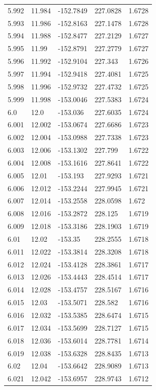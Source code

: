 \begin{tabular}{lllll}
5.992 & 11.984 & -152.7849 & 227.0828 & 1.6728 \\
5.993 & 11.986 & -152.8163 & 227.1478 & 1.6728 \\
5.994 & 11.988 & -152.8477 & 227.2129 & 1.6727 \\
5.995 & 11.99 & -152.8791 & 227.2779 & 1.6727 \\
5.996 & 11.992 & -152.9104 & 227.343 & 1.6726 \\
5.997 & 11.994 & -152.9418 & 227.4081 & 1.6725 \\
5.998 & 11.996 & -152.9732 & 227.4732 & 1.6725 \\
5.999 & 11.998 & -153.0046 & 227.5383 & 1.6724 \\
6.0 & 12.0 & -153.036 & 227.6035 & 1.6724 \\
6.001 & 12.002 & -153.0674 & 227.6686 & 1.6723 \\
6.002 & 12.004 & -153.0988 & 227.7338 & 1.6723 \\
6.003 & 12.006 & -153.1302 & 227.799 & 1.6722 \\
6.004 & 12.008 & -153.1616 & 227.8641 & 1.6722 \\
6.005 & 12.01 & -153.193 & 227.9293 & 1.6721 \\
6.006 & 12.012 & -153.2244 & 227.9945 & 1.6721 \\
6.007 & 12.014 & -153.2558 & 228.0598 & 1.672 \\
6.008 & 12.016 & -153.2872 & 228.125 & 1.6719 \\
6.009 & 12.018 & -153.3186 & 228.1903 & 1.6719 \\
6.01 & 12.02 & -153.35 & 228.2555 & 1.6718 \\
6.011 & 12.022 & -153.3814 & 228.3208 & 1.6718 \\
6.012 & 12.024 & -153.4128 & 228.3861 & 1.6717 \\
6.013 & 12.026 & -153.4443 & 228.4514 & 1.6717 \\
6.014 & 12.028 & -153.4757 & 228.5167 & 1.6716 \\
6.015 & 12.03 & -153.5071 & 228.582 & 1.6716 \\
6.016 & 12.032 & -153.5385 & 228.6474 & 1.6715 \\
6.017 & 12.034 & -153.5699 & 228.7127 & 1.6715 \\
6.018 & 12.036 & -153.6014 & 228.7781 & 1.6714 \\
6.019 & 12.038 & -153.6328 & 228.8435 & 1.6713 \\
6.02 & 12.04 & -153.6642 & 228.9089 & 1.6713 \\
6.021 & 12.042 & -153.6957 & 228.9743 & 1.6712 \\

\end{tabular}
